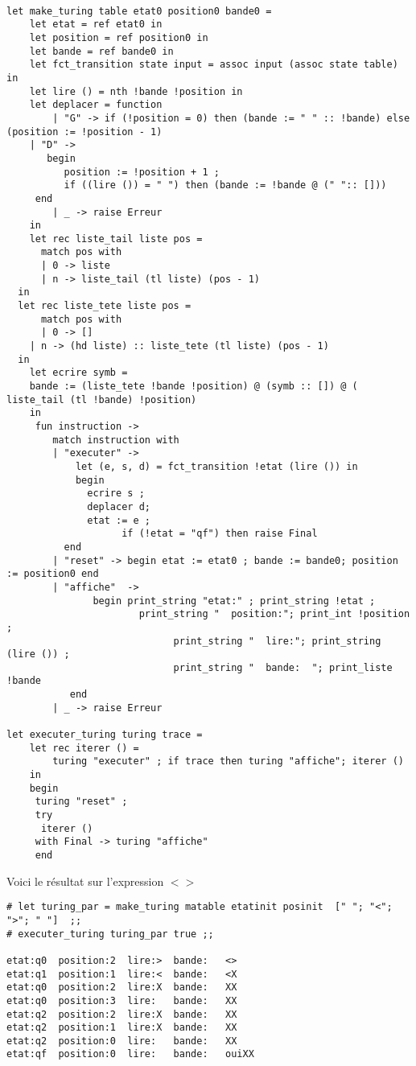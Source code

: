 \begin{Verbatim}

let make_turing table etat0 position0 bande0 =
	let etat = ref etat0 in
	let position = ref position0 in
	let bande = ref bande0 in
	let fct_transition state input = assoc input (assoc state table) in
	let lire () = nth !bande !position in
	let deplacer = function 
		| "G" -> if (!position = 0) then (bande := " " :: !bande) else (position := !position - 1) 
    | "D" -> 
	   begin
		  position := !position + 1 ;
		  if ((lire ()) = " ") then (bande := !bande @ (" ":: []))
   	 end
		| _ -> raise Erreur
	in
	let rec liste_tail liste pos =
	  match pos with
	  | 0 -> liste
	  | n -> liste_tail (tl liste) (pos - 1)
  in
  let rec liste_tete liste pos =
	  match pos with
	  | 0 -> []
  	| n -> (hd liste) :: liste_tete (tl liste) (pos - 1)
  in
	let ecrire symb =
	bande := (liste_tete !bande !position) @ (symb :: []) @ ( liste_tail (tl !bande) !position)
	in
	 fun instruction ->
		match instruction with
		| "executer" -> 
			let (e, s, d) = fct_transition !etat (lire ()) in
	    	begin
		      ecrire s ;
		      deplacer d;
		      etat := e ;
					if (!etat = "qf") then raise Final 
	      end 
		| "reset" -> begin etat := etat0 ; bande := bande0; position := position0 end
		| "affiche"  -> 
			   begin print_string "etat:" ; print_string !etat ; 
				       print_string "  position:"; print_int !position ; 
							 print_string "  lire:"; print_string (lire ()) ;
							 print_string "  bande:  "; print_liste !bande
	       end	
		| _ -> raise Erreur
		
let executer_turing turing trace =
	let rec iterer () =
		turing "executer" ; if trace then turing "affiche"; iterer () 
	in
	begin
	 turing "reset" ;
	 try
	  iterer () 
	 with Final -> turing "affiche"
	 end 

\end{Verbatim}

Voici le résultat sur l'expression $ <> $
\begin{Verbatim}
# let turing_par = make_turing matable etatinit posinit  [" "; "<"; ">"; " "]  ;;
# executer_turing turing_par true ;;

etat:q0  position:2  lire:>  bande:   <> 
etat:q1  position:1  lire:<  bande:   <X 
etat:q0  position:2  lire:X  bande:   XX 
etat:q0  position:3  lire:   bande:   XX  
etat:q2  position:2  lire:X  bande:   XX  
etat:q2  position:1  lire:X  bande:   XX  
etat:q2  position:0  lire:   bande:   XX  
etat:qf  position:0  lire:   bande:   ouiXX  
\end{Verbatim}

